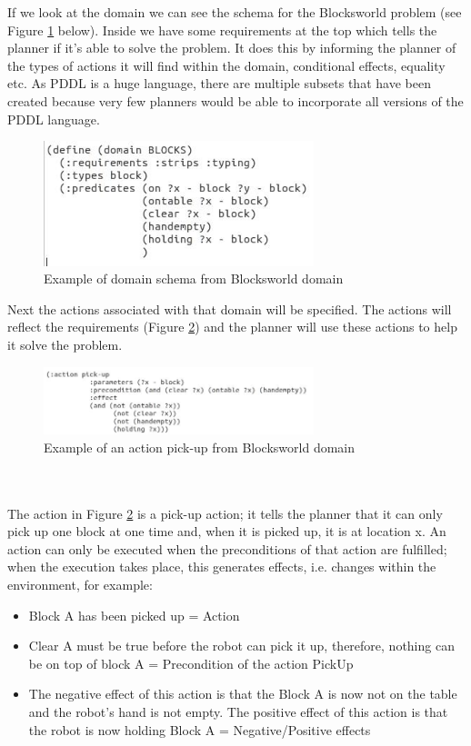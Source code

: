 If we look at the domain we can see the schema for the Blocksworld problem (see Figure \ref{fig:Blocksworld Domain} below). Inside we have some requirements at the top which tells the planner if it's able to solve the problem. It does this by informing the planner of the types of actions it will find within the domain, conditional effects, equality etc. As PDDL is a huge language, there are multiple subsets that have been created because very few planners would be able to incorporate all versions of the PDDL language. 
\begin{figure}[!htb]
    \centering
    \includegraphics[scale=1.8,width=0.70\textwidth]{BlocksworldDomain1.jpg}
    \caption{Example of domain schema from Blocksworld domain}
    \label{fig:Blocksworld Domain}
\end{figure}
Next the actions associated with that domain will be specified. The actions will reflect the requirements (Figure \ref{fig:Blocksworld Pick-up Action}) and the planner will use these actions to help it solve the problem. 
\begin{figure}[h]
    \centering
    \includegraphics[scale=2.0,width=0.70\textwidth]{BlocksworldDomainAction.jpg}
    \caption{Example of an action pick-up from Blocksworld domain}
    \label{fig:Blocksworld Pick-up Action}
\end{figure}
\\
\\
The action in Figure \ref{fig:Blocksworld Pick-up Action} is a pick-up action; it tells the planner that it can only pick up one block at one time and, when it is picked up, it is at location x. An action can only be executed when the preconditions of that action are fulfilled; when the execution takes place, this generates effects, i.e. changes within the environment, for example:
\begin{itemize}
\item Block A has been picked up = Action
\item Clear A must be true before the robot can pick it up, therefore, nothing can be on top of block A = Precondition of the action PickUp
\item The negative effect of this action is that the Block A is now not on the table and the robot's hand is not empty. The positive effect of this action is that the robot is now holding Block A = Negative/Positive effects 
\end{itemize}

